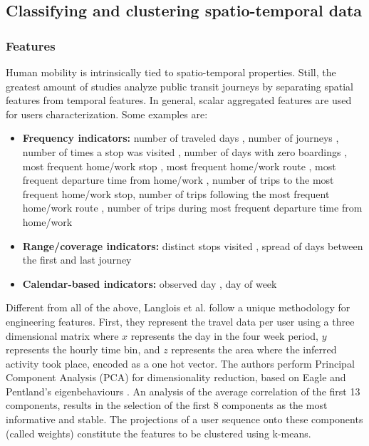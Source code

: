 \documentclass{article}
\begin{document}
\subsection{Classifying and clustering spatio-temporal data}


\subsubsection{Features}
Human mobility is intrinsically tied to spatio-temporal properties. Still, the greatest amount of studies analyze public transit journeys by separating spatial features from temporal features. In general, scalar aggregated features are used for users characterization. Some examples are:

\begin{itemize}
\item \textbf{Frequency indicators:} number of traveled days \cite{bhaskar2015passenger} \cite{langlois2016inferring} \cite{ma2017understanding}, number of journeys \cite{bhaskar2015passenger}, number of times a stop was visited \cite{morency2007measuring}, number of days with zero boardings \cite{morency2007measuring}, most frequent home/work stop \cite{ma2017understanding}, most frequent home/work route \cite{ma2017understanding}, most frequent departure time from home/work \cite{ma2017understanding}, number of trips to the most frequent home/work stop\cite{ma2017understanding}, number of trips following the most frequent home/work route \cite{ma2017understanding}, number of trips during most frequent departure time from home/work \cite{ma2017understanding}

\item \textbf{Range/coverage indicators:} distinct stops visited \cite{morency2007measuring}, spread of days between the first and last journey \cite{langlois2016inferring}

\item \textbf{Calendar-based indicators:} observed day \cite{morency2007measuring}, day of week \cite{morency2007measuring}

\end{itemize}


Different from all of the above, Langlois et al. follow a unique methodology for engineering features. First, they represent the travel data per user using a three dimensional matrix where $x$ represents the day in the four week period, $y$ represents the hourly time bin, and $z$ represents the area where the inferred activity took place, encoded as a one hot vector. The authors perform Principal Component Analysis (PCA) for dimensionality reduction, based on Eagle and Pentland's eigenbehaviours \cite{eagle2009eigenbehaviors}. An analysis of the average correlation of the first 13 components, results in the selection of the first 8 components as the most informative and stable. The projections of a user sequence onto these components (called weights) constitute the features to be clustered using k-means. \cite{langlois2016inferring}
\end{document}
